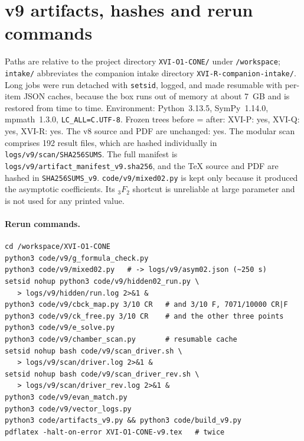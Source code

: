 \documentclass[11pt,a4paper]{article}
\newcommand{\loc}[1]{\nolinkurl{#1}}
\theoremstyle{plain}
\theoremstyle{definition}
\theoremstyle{remark}
\numberwithin{equation}{section}
\begin{document}
\section{v9 artifacts, hashes and rerun commands}
\label{app:v9artifacts}

Paths are relative to the project directory \loc{XVI-O1-CONE/} under \loc{/workspace}; \loc{intake/} abbreviates the companion intake directory \loc{XVI-R-companion-intake/}. Long jobs
were run detached with \loc{setsid}, logged, and made resumable
with per-item JSON caches, because the box runs out of memory at
about 7~GB and is restored from time to time. Environment:
Python~3.13.5, SymPy~1.14.0, mpmath~1.3.0, \loc{LC_ALL=C.UTF-8}.
Frozen trees before = after: XVI-P: yes, XVI-Q: yes, XVI-R: yes.
The v8 source and PDF are unchanged: yes.
The modular scan comprises 192 result files, which are hashed individually in
\loc{logs/v9/scan/SHA256SUMS}. The full manifest is
\loc{logs/v9/artifact_manifest_v9.sha256}, and the \TeX{} source and
PDF are hashed in \loc{SHA256SUMS_v9}.
\loc{code/v9/mixed02.py} is kept only because it produced the
asymptotic coefficients. Its \({}_3F_2\) shortcut is unreliable at
large parameter and is not used for any printed value.

\paragraph{Rerun commands.}
\begin{verbatim}
cd /workspace/XVI-O1-CONE
python3 code/v9/g_formula_check.py
python3 code/v9/mixed02.py   # -> logs/v9/asym02.json (~250 s)
setsid nohup python3 code/v9/hidden02_run.py \
   > logs/v9/hidden/run.log 2>&1 &
python3 code/v9/cbck_map.py 3/10 CR   # and 3/10 F, 7071/10000 CR|F
python3 code/v9/ck_free.py 3/10 CR    # and the other three points
python3 code/v9/e_solve.py
python3 code/v9/chamber_scan.py       # resumable cache
setsid nohup bash code/v9/scan_driver.sh \
   > logs/v9/scan/driver.log 2>&1 &
setsid nohup bash code/v9/scan_driver_rev.sh \
   > logs/v9/scan/driver_rev.log 2>&1 &
python3 code/v9/evan_match.py
python3 code/v9/vector_logs.py
python3 code/artifacts_v9.py && python3 code/build_v9.py
pdflatex -halt-on-error XVI-O1-CONE-v9.tex   # twice
\end{verbatim}
\end{document}
